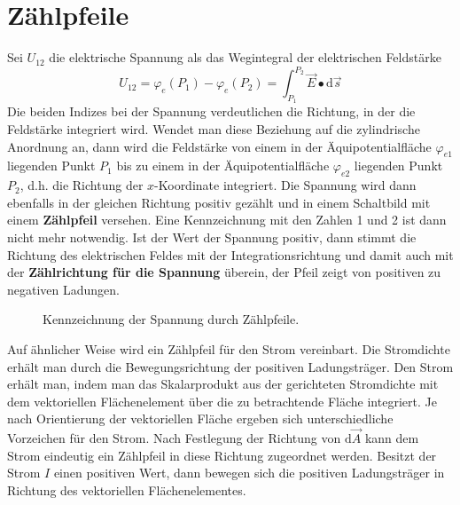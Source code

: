 \section{Zählpfeile}
Sei $U_{12}$ die elektrische Spannung als das Wegintegral der elektrischen Feldstärke
\begin{equation}
\boxed{U_{12}=\varphi_e\left(P_1\right)-\varphi_e\left(P_2\right)=\displaystyle \int_{P_1}^{P_2}\overrightarrow{E}\bullet \text{d}\overrightarrow{s}}
\end{equation}
Die beiden Indizes bei der Spannung verdeutlichen die Richtung, in der die Feldstärke integriert wird. Wendet man diese Beziehung auf die zylindrische Anordnung an, dann wird die Feldstärke von einem in der Äquipotentialfläche $\varphi_{e1}$ liegenden Punkt $P_1$ bis zu einem in der Äquipotentialfläche $\varphi_{e2}$ liegenden Punkt $P_2$, d.h. die Richtung der $x$-Koordinate integriert. Die Spannung wird dann ebenfalls in der gleichen Richtung positiv gezählt und in einem Schaltbild mit einem \textbf{Zählpfeil} versehen. Eine Kennzeichnung mit den Zahlen 1 und 2 ist dann nicht mehr notwendig. Ist der Wert der Spannung positiv, dann stimmt die Richtung des elektrischen Feldes mit der Integrationsrichtung und damit auch mit der \textbf{Zählrichtung für die Spannung} überein, der Pfeil zeigt von positiven zu negativen Ladungen.
\begin{figure}[H]
\centering
\caption{Kennzeichnung der Spannung durch Zählpfeile.}
\label{fig_IIIa}
\end{figure}
\noindent Auf ähnlicher Weise wird ein Zählpfeil für den Strom vereinbart. Die Stromdichte erhält man durch die Bewegungsrichtung der positiven Ladungsträger. Den Strom erhält man, indem man das Skalarprodukt aus der gerichteten Stromdichte mit dem vektoriellen Flächenelement über die zu betrachtende Fläche integriert. Je nach Orientierung der vektoriellen Fläche ergeben sich unterschiedliche Vorzeichen für den Strom. Nach Festlegung der Richtung von $\text{d}\overrightarrow{A}$ kann dem Strom eindeutig ein Zählpfeil in diese Richtung zugeordnet werden. Besitzt der Strom $I$ einen positiven Wert, dann bewegen sich die positiven Ladungsträger in Richtung des vektoriellen Flächenelementes. 
